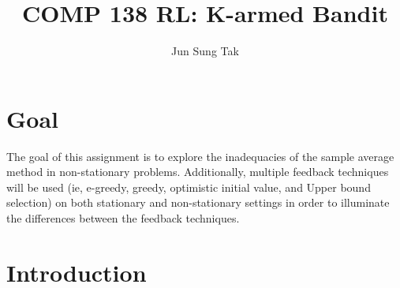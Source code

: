 \documentclass{article}
\title{COMP 138 RL: K-armed Bandit}
\author{Jun Sung Tak}
\begin{document}
\maketitle

\section{Goal}
The goal of this assignment is to explore the inadequacies of the sample average method in non-stationary problems. Additionally, multiple feedback techniques will be used (ie, e-greedy, greedy, optimistic initial value, and Upper bound selection) on both stationary and non-stationary settings in order to illuminate the differences between the feedback techniques.


\section{Introduction}



\end{document}
